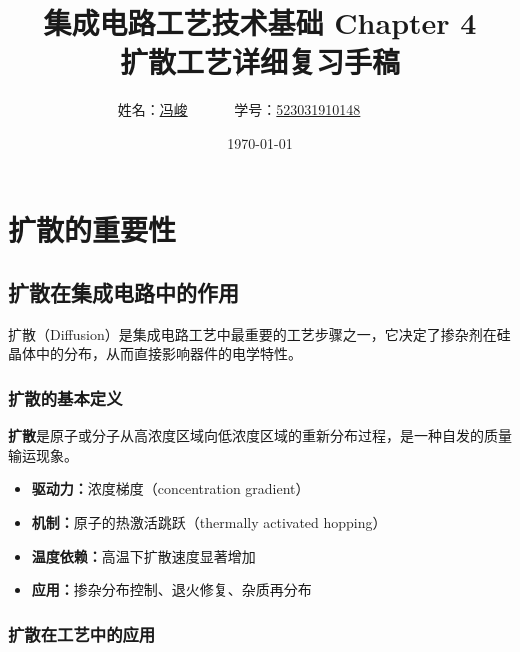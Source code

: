 \documentclass[UTF8,12pt,a4paper]{ctexart}
\title{集成电路工艺技术基础 Chapter 4\\扩散工艺详细复习手稿}
\author{
姓名：\underline{冯峻}~~~~~~
学号：\underline{523031910148}~~~~~~}
\date{\today}
\begin{document}
\fancyfoot[C]{\thepage}

\maketitle
\tableofcontents
\newpage

\section{扩散的重要性}

\subsection{扩散在集成电路中的作用}

扩散（Diffusion）是集成电路工艺中最重要的工艺步骤之一，它决定了掺杂剂在硅晶体中的分布，从而直接影响器件的电学特性。

\subsubsection{扩散的基本定义}

\textbf{扩散}是原子或分子从高浓度区域向低浓度区域的重新分布过程，是一种自发的质量输运现象。

\begin{itemize}
    \item \textbf{驱动力：}浓度梯度（concentration gradient）
    \item \textbf{机制：}原子的热激活跳跃（thermally activated hopping）
    \item \textbf{温度依赖：}高温下扩散速度显著增加
    \item \textbf{应用：}掺杂分布控制、退火修复、杂质再分布
\end{itemize}

\subsubsection{扩散在工艺中的应用}
\end{document}
